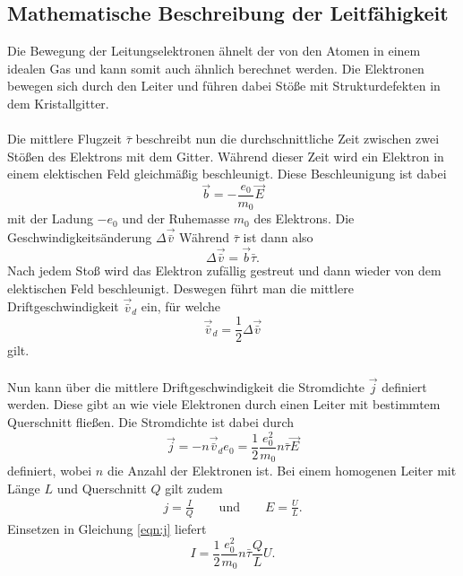 \subsection{Mathematische Beschreibung der Leitfähigkeit}
Die Bewegung der Leitungselektronen ähnelt der von den Atomen in einem idealen Gas und kann somit auch ähnlich
berechnet werden. Die Elektronen bewegen sich durch den Leiter und führen dabei Stöße mit Strukturdefekten in
dem Kristallgitter.\\\\
Die mittlere Flugzeit $\bar{\tau}$ beschreibt nun die durchschnittliche Zeit zwischen zwei Stößen des Elektrons mit
dem Gitter. Während dieser Zeit wird ein Elektron in einem elektischen Feld gleichmäßig beschleunigt. Diese
Beschleunigung ist dabei
\begin{equation*}
    \vec{b}=-\frac{e_0}{m_0}\vec{E}
\end{equation*}
mit der Ladung $-e_0$ und der Ruhemasse $m_0$ des Elektrons. Die Geschwindigkeitsänderung $\Delta\vec{\bar{v}}$
Während $\bar{\tau}$ ist dann also
\begin{equation*}
    \Delta\vec{\bar{v}}=\vec{b}\bar{\tau}.
\end{equation*}
Nach jedem Stoß wird das Elektron zufällig gestreut und dann wieder von dem elektischen Feld
beschleunigt. Deswegen führt man die mittlere Driftgeschwindigkeit $\vec{\bar{v}}_d$ ein, für welche
\begin{equation*}
    \vec{\bar{v}}_d=\frac{1}{2}\Delta\vec{\bar{v}}
\end{equation*}
gilt. \\\\
Nun kann über die mittlere Driftgeschwindigkeit die Stromdichte $\vec{j}$ definiert werden. Diese gibt an
wie viele Elektronen durch einen Leiter mit bestimmtem Querschnitt fließen. Die Stromdichte ist dabei durch
\begin{equation}
    \vec{j}=-n \vec{\bar{v}}_d e_0
    =\frac{1}{2}\frac{e_0^2}{m_0}n\bar{\tau}\vec{E} \label{eqn:j}
\end{equation}
definiert, wobei $n$ die Anzahl der Elektronen ist. Bei einem homogenen Leiter mit Länge $L$ und Querschnitt
$Q$ gilt zudem
\begin{align*}
    j=\frac{I}{Q} \qquad \text{und} \qquad E=\frac{U}{L}.
\end{align*}
Einsetzen in Gleichung \eqref{eqn:j} liefert
\begin{equation}
    I=\frac{1}{2}\frac{e_0^2}{m_0}n\bar{\tau}\frac{Q}{L}U. \label{eqn:I}
\end{equation}
